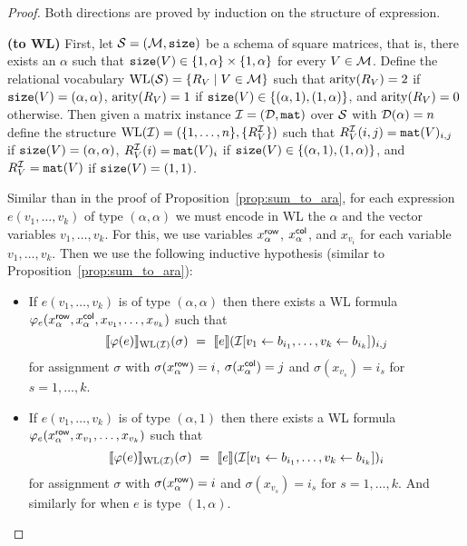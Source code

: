 \begin{proof}
Both directions are proved by induction on the structure of expression.

\smallskip

\noindent \textbf{(\langprod to WL)} First, let $\mathcal{S}=(\mathcal{M},\texttt{size})$ be a schema of square matrices, that is, there exists an $\alpha$ such 
that $\texttt{size}(V) \in \{1, \alpha\} \times \{1,\alpha\}$ for every $V \in \mathcal{M}$.
Define the relational vocabulary $\text{WL}(\mathcal{S}) = \{R_V \mid V \in \mathcal{M}\}$ such that $\operatorname{arity}(R_V) = 2$ 
if $\texttt{size}(V) = (\alpha, \alpha)$, $\operatorname{arity}(R_V) = 1$ if $\texttt{size}(V) \in \{(\alpha,1), (1,\alpha)\}$, and 
$\operatorname{arity}(R_V) = 0$ otherwise.
Then given a matrix instance $\mathcal{I} = (\mathcal{D},\texttt{mat})$ over $\mathcal{S}$ with  $\mathcal{D}(\alpha) = n$ define the structure 
$\text{WL}(\mathcal{I}) = (\{1, \ldots, n\}, \{R_V^{\mathcal{I}}\} )$ such that 
$R_V^{\mathcal{I}}(i, j) = \texttt{mat}(V)_{i,j}$ if $\texttt{size}(V) = (\alpha, \alpha)$, $R_V^{\mathcal{I}}(i) = \texttt{mat}(V)_{i}$ 
if $\texttt{size}(V) \in \{(\alpha,1), (1,\alpha)\}$, and $R_V^{\mathcal{I}} = \texttt{mat}(V)$ if $\texttt{size}(V) = (1,1)$.

Similar than in the proof of Proposition~\ref{prop:sum_to_ara}, for each expression $e(v_1, \ldots, v_k)$ of type $(\alpha, \alpha)$ we must encode in WL the $\alpha$ and the vector variables $v_1, \ldots, v_k$. For this, we use variables $x_{\alpha}^{\mathsf{row}}$, $x_{\alpha}^{\mathsf{col}}$, and $x_{v_i}$ for each variable $v_1, \ldots, v_k$. Then we use the following inductive hypothesis (similar to Proposition~\ref{prop:sum_to_ara}):

\newcommand{\varphie}{\varphi_e}
\newcommand{\xr}{x_{\alpha}^\row}
\newcommand{\xc}{x_{\alpha}^\col}

\begin{itemize}
	\item If $e(v_1,\ldots,v_k)$ is of type $(\alpha,\alpha)$ then there exists a WL formula $\varphie(x_{\alpha}^\row,x_{\alpha}^\col, x_{v_1}, \ldots, x_{v_k})$ such that
	$$
	\ssem{\varphi(e)}{\text{WL}(\I)}(\sigma) \ = \ \sem{e}{\I[v_1\gets b_{i_1},\ldots,v_k\gets b_{i_k}]}_{i,j}
	$$
	for assignment $\sigma$ with $\sigma(\xr)=i$, $\sigma(\xc)=j$ and $\sigma(x_{v_s})=i_s$ for $s=1,\ldots, k$.
	
	\item If $e(v_1,\ldots,v_k)$ is of type $(\alpha,1)$ then there exists a WL formula $\varphie(x_{\alpha}^\row, x_{v_1}, \ldots, x_{v_k})$ such that
	$$
	\ssem{\varphi(e)}{\text{WL}(\I)}(\sigma) \ = \ \sem{e}{\I[v_1\gets b_{i_1},\ldots,v_k\gets b_{i_k}]}_{i}
	$$
	for assignment $\sigma$ with $\sigma(\xr)=i$ and $\sigma(x_{v_s})=i_s$ for $s=1,\ldots, k$.
	And similarly for when $e$ is type $(1,\alpha)$.
	

\end{itemize}
\end{proof}
